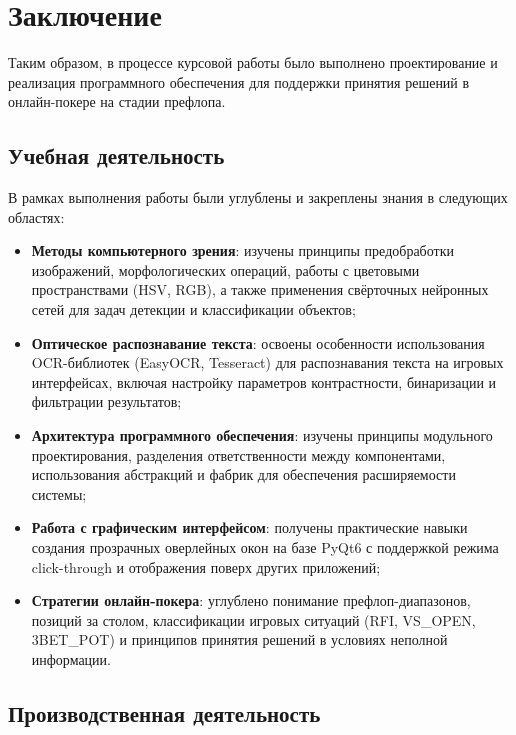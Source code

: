 \section{Заключение}
\label{sec:conclusion}

Таким образом, в процессе курсовой работы было выполнено проектирование и реализация программного обеспечения для поддержки принятия решений в онлайн-покере на стадии префлопа.

\subsection*{Учебная деятельность}

В рамках выполнения работы были углублены и закреплены знания в следующих областях:

\begin{itemize}
    \item \textbf{Методы компьютерного зрения}: изучены принципы предобработки изображений, морфологических операций, работы с цветовыми пространствами (HSV, RGB), а также применения свёрточных нейронных сетей для задач детекции и классификации объектов;
    
    \item \textbf{Оптическое распознавание текста}: освоены особенности использования OCR-библиотек (EasyOCR, Tesseract) для распознавания текста на игровых интерфейсах, включая настройку параметров контрастности, бинаризации и фильтрации результатов;
    
    \item \textbf{Архитектура программного обеспечения}: изучены принципы модульного проектирования, разделения ответственности между компонентами, использования абстракций и фабрик для обеспечения расширяемости системы;
    
    \item \textbf{Работа с графическим интерфейсом}: получены практические навыки создания прозрачных оверлейных окон на базе PyQt6 с поддержкой режима click-through и отображения поверх других приложений;
    
    \item \textbf{Стратегии онлайн-покера}: углублено понимание префлоп-диапазонов, позиций за столом, классификации игровых ситуаций (RFI, VS\_OPEN, 3BET\_POT) и принципов принятия решений в условиях неполной информации.
\end{itemize}

\subsection*{Производственная деятельность}

